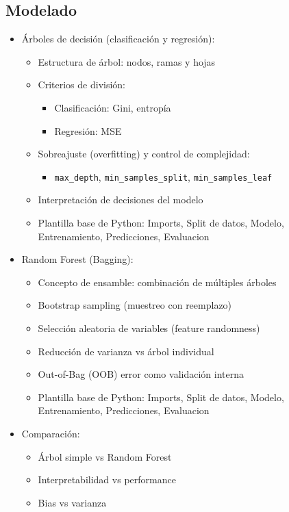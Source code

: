 \documentclass[12pt,a4paper,openany,oneside]{book}
\begin{document}
\begin{itemize}
\subsection{Modelado}
\begin{itemize}
    \item Árboles de decisión (clasificación y regresión):
    \begin{itemize}
        \item Estructura de árbol: nodos, ramas y hojas
        \item Criterios de división:
        \begin{itemize}
            \item Clasificación: Gini, entropía
            \item Regresión: MSE
        \end{itemize}
        \item Sobreajuste (overfitting) y control de complejidad:
        \begin{itemize}
            \item \texttt{max\_depth}, \texttt{min\_samples\_split}, \texttt{min\_samples\_leaf}
        \end{itemize}
        \item Interpretación de decisiones del modelo
        \item Plantilla base de Python: Imports, Split de datos, Modelo, Entrenamiento, Predicciones, Evaluacion
    \end{itemize}

    \item Random Forest (Bagging):
    \begin{itemize}
        \item Concepto de ensamble: combinación de múltiples árboles
        \item Bootstrap sampling (muestreo con reemplazo)
        \item Selección aleatoria de variables (feature randomness)
        \item Reducción de varianza vs árbol individual
        \item Out-of-Bag (OOB) error como validación interna
        \item Plantilla base de Python: Imports, Split de datos, Modelo, Entrenamiento, Predicciones, Evaluacion
    \end{itemize}

    \item Comparación:
    \begin{itemize}
        \item Árbol simple vs Random Forest
        \item Interpretabilidad vs performance
        \item Bias vs varianza
    \end{itemize}
\end{itemize}


\end{itemize}
\end{document}
